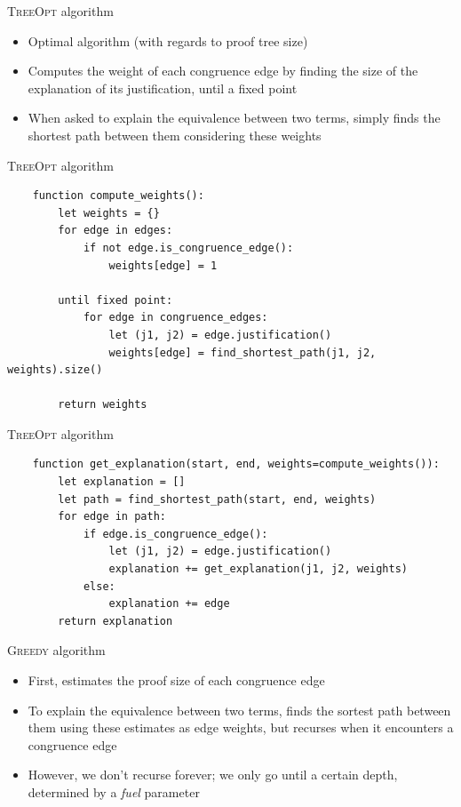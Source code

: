 \documentclass[aspectratio=169]{beamer}
\newcommand\vitem{\vfill\item}
\newcommand\pvitem{\pause\vfill\item}
\begin{document}
\begin{frame}{\textsc{TreeOpt} algorithm}
  \begin{itemize}
    \item Optimal algorithm (with regards to proof tree size)
    \vitem Computes the weight of each congruence edge by finding the size of
    the explanation of its justification, until a fixed point
    \vitem When asked to explain the equivalence between two terms, simply finds
    the shortest path between them considering these weights
  \end{itemize}
\end{frame}

\begin{frame}[fragile]{\textsc{TreeOpt} algorithm}
  \begin{verbatim}
    function compute_weights():
        let weights = {}
        for edge in edges:
            if not edge.is_congruence_edge():
                weights[edge] = 1

        until fixed point:
            for edge in congruence_edges:
                let (j1, j2) = edge.justification()
                weights[edge] = find_shortest_path(j1, j2, weights).size()

        return weights
  \end{verbatim}
\end{frame}

\begin{frame}[fragile]{\textsc{TreeOpt} algorithm}
  \begin{verbatim}
    function get_explanation(start, end, weights=compute_weights()):
        let explanation = []
        let path = find_shortest_path(start, end, weights)
        for edge in path:
            if edge.is_congruence_edge():
                let (j1, j2) = edge.justification()
                explanation += get_explanation(j1, j2, weights)
            else:
                explanation += edge
        return explanation
  \end{verbatim}
\end{frame}

\begin{frame}{\textsc{Greedy} algorithm}
  \begin{itemize}
    \item First, estimates the proof size of each congruence edge
    \vitem To explain the equivalence between two terms, finds the sortest path
    between them using these estimates as edge weights, but recurses when it
    encounters a congruence edge
    \pvitem However, we don't recurse forever; we only go until a certain depth,
    determined by a \emph{fuel} parameter
  \end{itemize}
\end{frame}
\end{document}
